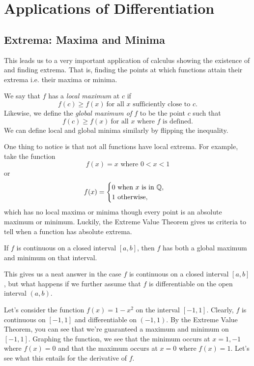 
\section{Applications of Differentiation}

\subsection{Extrema: Maxima and Minima}

This leads us to a very important application of calculus showing the existence of and finding extrema. That is, finding the points at which functions attain their extrema i.e. their maxima or minima.

\begin{defn}
  We say that $f$ has a \emph{local maximum} at $c$ if
  \[
f(c)\geq f(x)\ \text{for all }x\text{ sufficiently close to } c.
  \]
Likewise, we define the \emph{global maximum of $f$} to be the point $c$ such that
\[
f(c)\geq f(x)\ \text{for all }x\text{ where $f$ is defined.}
\]
We can define local and global minima similarly by flipping the inequality.
\end{defn}

One thing to notice is that not all functions have local extrema. For example, take the function
\[
f(x)=x \text{ where } 0<x<1
\] or
\[
f(x)= \begin{cases}
0 \text{ when $x$ is in } \mathbb{Q},  \\
1 \text{ otherwise},
\end{cases}
\] which has no local maxima or minima though every point is an absolute maximum or minimum. Luckily, the Extreme Value Theorem gives us criteria to tell when a function has absolute extrema.

\begin{thm}
  If $f$ is continuous on a closed interval $[a,b]$, then $f$ has both a global maximum and minimum on that interval.
\end{thm}

This gives us a neat answer in the case $f$ is continuous on a closed interval $[a,b]$, but what happens if we further assume that $f$ is differentiable on the open interval $(a,b)$.


Let's consider the function $f(x)=1-x^2$ on the interval $[-1,1]$. Clearly, $f$ is continuous on $[-1,1]$ and differentiable on $(-1,1)$. By the Extreme Value Theorem, you can see that we're guaranteed a maximum and minimum on $[-1,1]$. Graphing the function, we see that the minimum occurs at $x=1,-1$ where $f(x)=0$ and that the maximum occurs at $x=0$ where $f(x)=1$. Let's see what this entails for the derivative of $f$. \\


